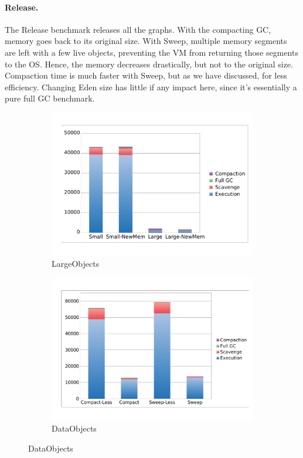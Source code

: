 \documentclass[10pt, sigplan]{acmart}
\begin{document}
\paragraph{Release.} The Release benchmark releases all the graphs. With the compacting GC, memory goes back to its original size. With Sweep, multiple memory segments are left with a few live objects, preventing the VM from returning those segments to the OS. Hence, the memory decreases drastically, but not to the original size. Compaction time is much faster with Sweep, but as we have discussed, for less efficiency. Changing Eden size has little if any impact here, since it's essentially a pure full GC benchmark.


\begin{figure}[b!]
	\centering
    
    \begin{subfigure}[b]{.499\textwidth}
	\includegraphics[width=\linewidth]{figures/large} 
	\caption{LargeObjects\vspace{0.2cm}}
   	\end{subfigure}\hspace{0.00000001\textwidth}%
   	\begin{subfigure}[b]{.499\textwidth}
	\includegraphics[width=\linewidth]{figures/data} 
	\caption{DataObjects\vspace{0.2cm}}
   	\end{subfigure}	


\end{figure}
\end{document}
